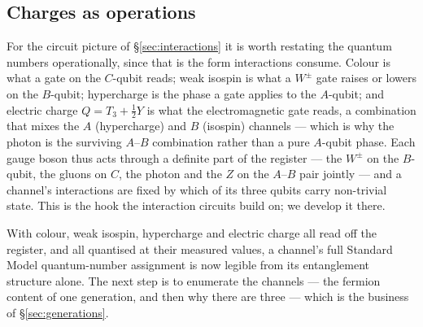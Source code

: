 \subsection{Charges as operations}

For the circuit picture of \S\ref{sec:interactions} it is worth restating the quantum numbers
operationally, since that is the form interactions consume. Colour is what a gate on the $C$-qubit
reads; weak isospin is what a $W^\pm$ gate raises or lowers on the $B$-qubit; hypercharge is the
phase a gate applies to the $A$-qubit; and electric charge $Q = T_3 + \tfrac12 Y$ is what the
electromagnetic gate reads, a combination that mixes the $A$ (hypercharge) and $B$ (isospin)
channels --- which is why the photon is the surviving $A$--$B$ combination rather than a pure
$A$-qubit phase. Each gauge boson thus acts through a definite part of the register --- the
$W^\pm$ on the $B$-qubit, the gluons on $C$, the photon and the $Z$ on the $A$--$B$ pair jointly
--- and a channel's interactions are fixed by which of its three qubits carry non-trivial state.
This is the hook the interaction circuits build on; we develop it there.

With colour, weak isospin, hypercharge and electric charge all read off the register, and all
quantised at their measured values, a channel's full Standard Model quantum-number assignment is
now legible from its entanglement structure alone. The next step is to enumerate the channels ---
the fermion content of one generation, and then why there are three --- which is the business of
\S\ref{sec:generations}.
